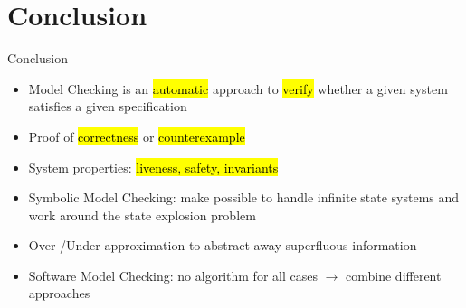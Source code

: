 
\section{Conclusion}

\begin{frame}{Conclusion}
\begin{itemize}
\itemsep1em
\item Model Checking is an \hl{automatic} approach to \hl{verify} whether a given system satisfies a given specification
\item Proof of \hl{correctness} or \hl{counterexample} 
\item System properties: \hl{liveness, safety, invariants}
\item Symbolic Model Checking: make possible to handle infinite state systems and work around the state explosion problem
\item Over-/Under-approximation to abstract away superfluous information
\item Software Model Checking: no algorithm for all cases $\rightarrow$ combine different approaches    
\end{itemize}

\end{frame}